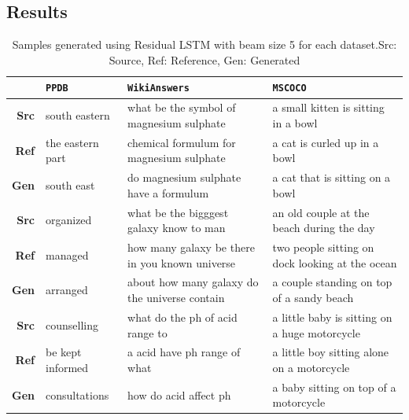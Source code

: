 \subsection{Results}
\begin{table}[htbp]
\centering
\footnotesize
{}
\hspace*{-6em}
\begin{tabular}{rlll}
\midrule
\multicolumn{1}{l}{}           & \multicolumn{1}{l}{{\texttt{PPDB}}}                                  & \multicolumn{1}{l}{{\texttt{WikiAnswers}}}                                                       & \multicolumn{1}{l}{{\texttt{MSCOCO}}}                              \\ \hline
\multicolumn{1}{r|}{\textbf{Src}}    & \multicolumn{1}{l||}{south eastern}    & \multicolumn{1}{l||}{what be the symbol of magnesium sulphate} & a small kitten is sitting in a bowl \\
\multicolumn{1}{r|}{\textbf{Ref}} & \multicolumn{1}{l||}{the eastern part} & \multicolumn{1}{l||}{chemical formulum for magnesium sulphate}  & a cat is curled up in a bowl        \\
\multicolumn{1}{r|}{\textbf{Gen}} & \multicolumn{1}{l||}{south east}       & \multicolumn{1}{l||}{do magnesium sulphate have a formulum}    & a cat that is sitting on a bowl     \\ \hline
\multicolumn{1}{r|}{\textbf{Src}}    & \multicolumn{1}{l||}{organized}        & \multicolumn{1}{l||}{what be the bigggest galaxy know to man} & an old couple at the beach during the day \\
\multicolumn{1}{r|}{\textbf{Ref}} & \multicolumn{1}{l||}{managed}          & \multicolumn{1}{l||}{how many galaxy be there in you known universe}  & two people sitting on dock looking at the ocean        \\
\multicolumn{1}{r|}{\textbf{Gen}} & \multicolumn{1}{l||}{arranged}         & \multicolumn{1}{l||}{about how many galaxy do the universe contain}    & a couple standing on top of a sandy beach    \\ \hline
\multicolumn{1}{r|}{\textbf{Src}}    & \multicolumn{1}{l||}{counselling}      & \multicolumn{1}{l||}{what do the ph of acid range to} & a little baby is sitting on a huge motorcycle \\
\multicolumn{1}{r|}{\textbf{Ref}} & \multicolumn{1}{l||}{be kept informed} & \multicolumn{1}{l||}{a acid have ph range of what}  &  a little boy sitting alone on a motorcycle       \\
\multicolumn{1}{r|}{\textbf{Gen}} & \multicolumn{1}{l||}{consultations}    & \multicolumn{1}{l||}{how do acid affect ph}    &    a baby sitting on top of a motorcycle \\ \hline
\end{tabular}
\caption[Sample paraphrases]{Samples generated using Residual LSTM with beam size 5 for each dataset.Src: Source, Ref: Reference, Gen: Generated}
\label{samples}
\end{table}
